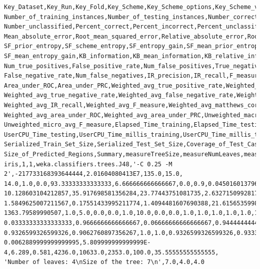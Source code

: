 \begin{lrbox}{\verbbox}
\begin{minipage}{.98\textwidth}
\begin{mdframed}[innermargin=-1.5cm]
\begin{Verbatim}[fontsize=\scriptsize]
Key_Dataset,Key_Run,Key_Fold,Key_Scheme,Key_Scheme_options,Key_Scheme_version_ID,Date_time,
Number_of_training_instances,Number_of_testing_instances,Number_correct,Number_incorrect,
Number_unclassified,Percent_correct,Percent_incorrect,Percent_unclassified,Kappa_statistic,
Mean_absolute_error,Root_mean_squared_error,Relative_absolute_error,Root_relative_squared_error,
SF_prior_entropy,SF_scheme_entropy,SF_entropy_gain,SF_mean_prior_entropy,SF_mean_scheme_entropy,
SF_mean_entropy_gain,KB_information,KB_mean_information,KB_relative_information,True_positive_rate,
Num_true_positives,False_positive_rate,Num_false_positives,True_negative_rate,Num_true_negatives,
False_negative_rate,Num_false_negatives,IR_precision,IR_recall,F_measure,Matthews_correlation,
Area_under_ROC,Area_under_PRC,Weighted_avg_true_positive_rate,Weighted_avg_false_positive_rate,
Weighted_avg_true_negative_rate,Weighted_avg_false_negative_rate,Weighted_avg_IR_precision,
Weighted_avg_IR_recall,Weighted_avg_F_measure,Weighted_avg_matthews_correlation,
Weighted_avg_area_under_ROC,Weighted_avg_area_under_PRC,Unweighted_macro_avg_F_measure,
Unweighted_micro_avg_F_measure,Elapsed_Time_training,Elapsed_Time_testing,UserCPU_Time_training,
UserCPU_Time_testing,UserCPU_Time_millis_training,UserCPU_Time_millis_testing,Serialized_Model_Size,
Serialized_Train_Set_Size,Serialized_Test_Set_Size,Coverage_of_Test_Cases_By_Regions,
Size_of_Predicted_Regions,Summary,measureTreeSize,measureNumLeaves,measureNumRules
iris,1,1,weka.classifiers.trees.J48,'-C 0.25 -M 2',-217733168393644444,2.01604080413E7,135.0,15.0,
14.0,1.0,0.0,93.33333333333333,6.666666666666667,0.0,0.9,0.0450160137965016,0.1693176548766098,
10.128603104212857,35.917698581356284,23.77443751081735,2.632715099281766,21.141722411535582,
1.5849625007211567,0.17551433995211774,1.4094481607690388,21.615653599867994,1.4410435733245328,
1363.79589990507,1.0,5.0,0.0,0.0,1.0,10.0,0.0,0.0,1.0,1.0,1.0,1.0,1.0,1.0,0.9333333333333333,
0.03333333333333333,0.9666666666666667,0.06666666666666667,0.9444444444444445,0.9333333333333333,
0.9326599326599326,0.9062760897356267,1.0,1.0,0.9326599326599326,0.9333333333333333,0.008,0.001,
0.0062889999999999995,5.809999999999999E-4,6.289,0.581,4236.0,10633.0,2353.0,100.0,35.55555555555555,
'Number of leaves: 4\nSize of the tree: 7\n',7.0,4.0,4.0
\end{Verbatim}
\end{mdframed}
\end{minipage}
\end{lrbox}%

